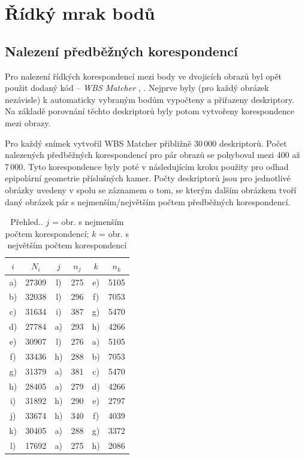 \documentclass[11pt,oneside,a4paper,pdftex]{article}   %
\begin{document}

\section{Řídký mrak bodů}
	
	\subsection{Nalezení předběžných korespondencí} Pro nalezení řídkých korespondencí mezi body ve
	dvojicích obrazů byl opět použit dodaný kód -- \emph{WBS Matcher} \cite{code_repo},
	\cite{WBS_Matcher}.  Nejprve byly (pro každý obrázek nezávisle) k automaticky vybraným
	 bodům vypočteny a přiřazeny deskriptory. Na základě porovnání těchto deskriptorů byly
	potom vytvořeny korespondence mezi obrazy.
	
	Pro každý snímek vytvořil WBS Matcher přibližně 30\,000 deskriptorů. Počet nalezených předběžných
	korespondencí pro pár obrazů se pohyboval mezi 400 až 7\,000. Tyto korespondence byly poté v
	následujícím kroku použity pro odhad epipolární geometrie pří\-slu\-šných kamer. Počty deskriptorů
	jsou pro jednotlivé obrázky uvedeny v  spolu se záznamem o tom,
	se kterým dalším obrázkem tvoří daný obrázek pár s nejmenším/největším počtem předběžných korespondencí.
	
		\begin{table}[h]
			\centering
			\begin{tabular}{|c|c|cccc|}
				\hline
				$i$ & $N_i$ & $j$ & $n_j$ & $k$ & $n_k$ \\
				\hline
				a) & 27309 & l) & 275 & e) & 5105 \\
				b) & 32038 & l) & 296 & f) & 7053 \\
				c) & 31634 & i) & 387 & g) & 5470 \\
				d) & 27784 & a) & 293 & h) & 4266 \\
				e) & 30907 & l) & 276 & a) & 5105 \\
				f) & 33436 & h) & 288 & b) & 7053 \\
				g) & 31379 & a) & 381 & c) & 5470 \\
				h) & 28405 & a) & 279 & d) & 4266 \\
				i) & 31892 & h) & 290 & e) & 2797 \\
				j) & 33674 & h) & 340 & f) & 4039 \\
				k) & 30405 & a) & 288 & g) & 3372 \\
				l) & 17692 & a) & 275 & h) & 2086 \\
				\hline
			\end{tabular}
			\caption{Přehled.. $j$ = obr. s nejmenším počtem korespondencí; $k$ = obr. s největším počtem korespondencí}
			\label{tab:wbs_features}
		\end{table}
	
\end{document}
